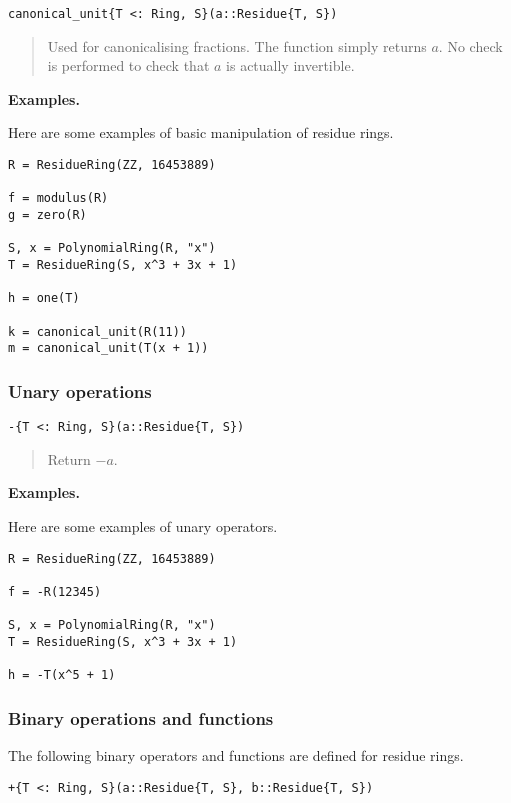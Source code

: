 \documentclass[a4paper,10pt]{article}
\newcommand{\desc}[1]{\vspace{-3mm}\begin{quote}#1\end{quote}}
\begin{document}
{{{\begin{lstlisting}
canonical_unit{T <: Ring, S}(a::Residue{T, S})
\end{lstlisting}

\desc{Used for canonicalising fractions. The function simply returns $a$. No
check is performed to check that $a$ is actually invertible.}

\textbf{Examples.}

Here are some examples of basic manipulation of residue rings.

\begin{lstlisting}
R = ResidueRing(ZZ, 16453889)

f = modulus(R)
g = zero(R)

S, x = PolynomialRing(R, "x")
T = ResidueRing(S, x^3 + 3x + 1)

h = one(T)

k = canonical_unit(R(11))
m = canonical_unit(T(x + 1))
\end{lstlisting}

\subsubsection{Unary operations}

\begin{lstlisting}
-{T <: Ring, S}(a::Residue{T, S})
\end{lstlisting}

\desc{Return $-a$.}

\textbf{Examples.}

Here are some examples of unary operators.

\begin{lstlisting}
R = ResidueRing(ZZ, 16453889)

f = -R(12345)

S, x = PolynomialRing(R, "x")
T = ResidueRing(S, x^3 + 3x + 1)

h = -T(x^5 + 1)
\end{lstlisting}

\subsubsection{Binary operations and functions}

The following binary operators and functions are defined for residue rings.

\begin{lstlisting}
+{T <: Ring, S}(a::Residue{T, S}, b::Residue{T, S})
\end{lstlisting}

}}}
\end{document}
